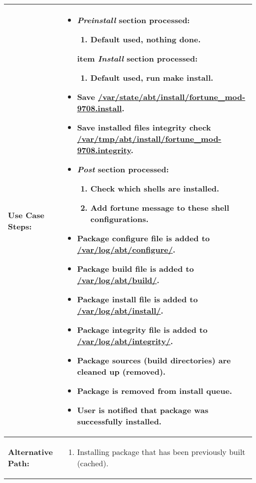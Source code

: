 \begin{tabularx}{\linewidth}{|l|X|}
\hline
\textbf{Use Case Steps:} & 
\begin{minipage}{\linewidth}
  \vspace{0.05em}
  \begin{itemize}
    \item \emph{Preinstall} section processed:
    \begin{enumerate}
      \item Default used, nothing done.
    \end{enumerate}
    item \emph{Install} section processed:
    \begin{enumerate}
      \item Default used, run \textbf{make install}.
    \end{enumerate}
    \item Save \url{/var/state/abt/install/fortune_mod-9708.install}.
    \item Save installed files integrity check \url{/var/tmp/abt/install/fortune_mod-9708.integrity}.
    \item \emph{Post} section processed:
    \begin{enumerate}
      \item Check which shells are installed.
      \item Add fortune message to these shell configurations.
    \end{enumerate}
    \item Package configure file is added to \url{/var/log/abt/configure/}.
    \item Package build file is added to \url{/var/log/abt/build/}.
    \item Package install file is added to \url{/var/log/abt/install/}.
    \item Package integrity file is added to \url{/var/log/abt/integrity/}.
    \item Package sources (build directories) are cleaned up (removed).
    \item Package is removed from install queue.
    \item User is notified that package was successfully installed.
  \end{itemize}
  \vspace{0.05em}
\end{minipage}
\\
\hline 
\textbf{Alternative Path:} &
\begin{minipage}{\linewidth}
  \vspace{0.05em} 
  \begin{enumerate}
    \item Installing package that has been previously built (cached).
  \end{enumerate}
  \vspace{0.05em} 
\end{minipage}
\\
\hline
\end{tabularx}

\newpage


